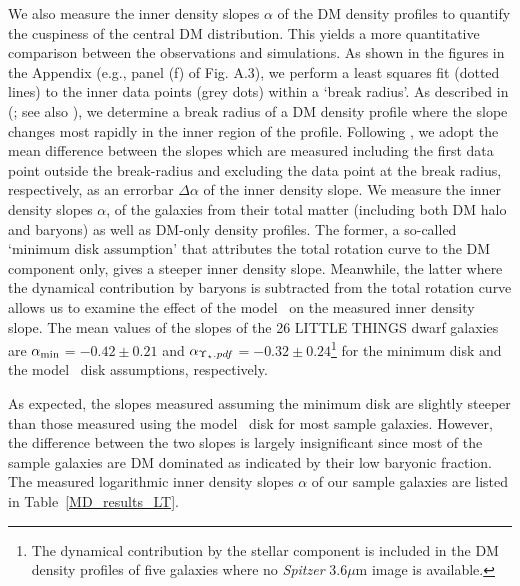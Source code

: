 \documentclass[natbib209]{emulateapj}
\begin{document}
We also measure the inner density slopes $\alpha$ of the DM density
profiles to quantify the cuspiness of the central DM distribution. This
yields a more quantitative comparison between the observations and simulations.
As shown in the figures in the Appendix (e.g., panel (f) of Fig. A.3), we
perform a least squares fit (dotted lines) to the inner
data points (grey dots) within a `break radius'. As described in
\citeauthor{deBlok_2002} (\citeyear{deBlok_2002}; see also \citeauthor{Oh_2011a} \citeyear{Oh_2011a}), we
determine a break radius of a DM density profile where the slope changes most
rapidly in the inner region of the profile. Following
\cite{deBlok_2002}, we adopt the mean difference between the slopes which are
measured including the first data point outside the break-radius and excluding
the data point at the break radius, respectively, as an errorbar $\Delta\alpha$
of the inner density slope. We measure the inner density slopes $\alpha$, of the galaxies from their
total matter (including both DM halo and baryons) as well as DM-only density
profiles. The former, a so-called `minimum disk assumption' that attributes the total
rotation curve to the DM component only, gives a steeper inner density slope.
Meanwhile, the latter where the dynamical
contribution by baryons is subtracted from the total rotation curve allows us to
examine the effect of the model \MLsps\ on the measured inner density slope. The
mean values of the slopes of the 26 LITTLE THINGS dwarf galaxies are
$\alpha_{\rm min}$$=$$-0.42\pm 0.21$ and $\alpha_{\Upsilon_{\star}.pdf}$$=$$-0.32\pm
0.24$\footnote{The dynamical contribution by the stellar component is included
in the DM density profiles of five galaxies where no {\it Spitzer} 3.6$\mu$m
image is available.} for the minimum disk and the model \MLsps\ disk assumptions, respectively.

As expected, the slopes measured assuming the minimum
disk are slightly steeper than those measured using the model \MLsps\ disk for most
sample galaxies. However, the difference between the two slopes is largely
insignificant since most of the sample galaxies are DM dominated as
indicated by their low baryonic fraction. The measured logarithmic inner density
slopes $\alpha$ of our sample galaxies are listed in Table~\ref{MD_results_LT}.
\end{document}
